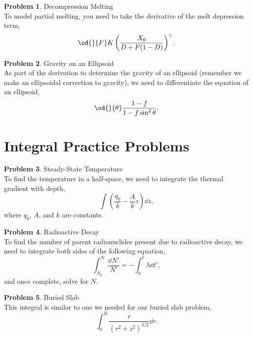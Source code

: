\documentclass[final,a4paper,12pt]{article}
\theoremstyle{definition}
\newtheorem{problem}{Problem}[section]
\begin{document}
\begin{problem}
    Decompression Melting \\
    To model partial melting, you need to take the derivative of the melt
    depression term,
    \begin{equation*}
        \od{}{F} K \left( \frac{X_0}{D + F(1 - D)} \right)^\gamma .
    \end{equation*}
\end{problem}

\begin{problem}
    Gravity on an Ellipsoid \\
    As part of the derivation to determine the gravity of an ellipsoid (remember
    we make an ellipsoidal correction to gravity), we need to differentiate the
    equation of an ellipsoid,
    \begin{equation}
    \od{}{\theta} \frac{1 - f}{1 - f\sin^2 \theta} .
    \end{equation}
\end{problem}




\section{Integral Practice Problems}

\begin{problem}
    Steady-State Temperature \\
    To find the temperature in a half-space, we need to integrate the thermal
    gradient with depth,
    \begin{equation*}
        \int \left( \frac{q_0}{k} - \frac{A}{k} z \right) \dd{z} ,
    \end{equation*}
    where $q_0$, $A$, and $k$ are constants.
\end{problem}

\begin{problem}
    Radioactive Decay \\
    To find the number of parent radionuclides present due to radioactive
    decay, we need to integrate both sides of the following equation,
    \begin{equation*}
        \int_{N_0}^N \frac{\dd{N'}}{N'} = - \int_0^t \lambda \dd{t'} ,
    \end{equation*}
    and once complete, solve for $N$.
\end{problem}

\begin{problem}
    Buried Slab \\
    This integral is similar to one we needed for our buried slab problem,
    \begin{equation*}
        \int_0^R \frac{r}{(r^2 + z^2)^{3/2}} \dd{r} .
    \end{equation*}
\end{problem}
\end{document}
